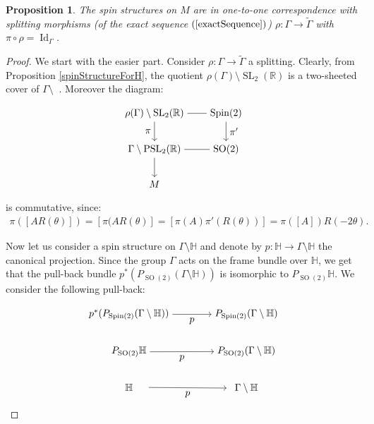 \documentclass[12pt]{amsart}
\newtheorem{proposition}{Proposition}%
\theoremstyle{definition}
\def\RR{{\mathbb R}}
\def\HH{{\mathbb{H}}}
\def\G{{\Gamma}}
\DeclareMathOperator{\psl}{PSL_2(\mathbb{R})}
\newcommand{\slinear}{\operatorname{SL}}
\newcommand{\so}{\operatorname{SO}}
\newcommand{\spin}{\operatorname{Spin}}
\newcommand{\Id}{\operatorname{Id}}
\begin{document}
\begin{proposition}
The spin structures on $M$ are in one-to-one correspondence with splitting morphisms (of the exact sequence $(\ref{exactSequence})$) $\rho : \G \longrightarrow \tilde{\G}$ with $\pi\circ \rho = \Id_{\G}$.
\end{proposition}
\begin{proof}
We start with the easier part. Consider $\rho : \G \longrightarrow \tilde{\G}$ a splitting. 
Clearly, from Proposition \ref{spinStructureForH}, the quotient $\rho(\G)\setminus \slinear_2(\RR)$ is a two-sheeted cover of $\G \setminus \psl$. Moreover the diagram:
\begin{equation*}
\begin{tikzpicture}[baseline=(current  bounding  box.center)]
  \matrix (m) [matrix of math nodes,row sep=2em,column sep=2em,minimum width=2em]
  {
      \rho(\G)\setminus \slinear_2(\RR)& \spin(2) \\
      \G\setminus\psl & \so(2) \\
	    M & {} \\  
  };
  \path
    (m-1-1) edge node [ above] {} (m-1-2)
    (m-2-1)	edge node [below] {} (m-2-2);
    
    
  \path[->] 
  	(m-1-1) edge node [left]{$\pi$} (m-2-1)
  	(m-1-2)	edge node [right] {$\pi'$} (m-2-2)
  	(m-2-1) edge node [left] {} (m-3-1);
\end{tikzpicture}
\end{equation*}
is commutative, since:
\begin{align*}
\pi([AR(\theta)])=[\pi(AR(\theta)]=[\pi(A)\pi'(R(\theta))]=\pi([A])R(-2\theta).
\end{align*}

Now let us consider a spin structure on $\G \setminus \HH$ and denote by $p:\HH \longrightarrow \G\setminus \HH$ the canonical projection. Since the group $\G$ acts on the frame bundle over $\HH$, we get that the pull-back bundle $p^*(P_{\so(2)}(\G\setminus \HH))$ is isomorphic to $P_{\so(2)} \HH$. We consider the following pull-back:
\begin{equation}\label{diagramPullBack}
\begin{tikzpicture}[baseline=(current  bounding  box.center)]
  \matrix (m) [matrix of math nodes,row sep=2em,column sep=4em,minimum width=4em]
  {
      p^*(P_{\spin(2)}(\G\setminus \HH)) & P_{\spin(2)}(\G\setminus \HH) \\
      P_{\so(2)} \HH & P_{\so(2)}(\G\setminus \HH) \\
	    \HH & \G\setminus \HH \\  
  };
  \path[->]
    (m-1-1) edge node [below] {$p$} (m-1-2)
    (m-2-1)	edge node [below] {$p$} (m-2-2)
    (m-3-1) edge node [below] {$p$} (m-3-2);
    

\end{tikzpicture}
\end{equation}
\end{proof}
\end{document}
